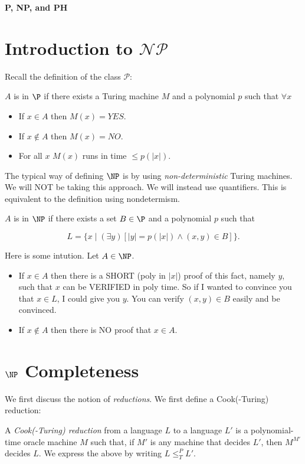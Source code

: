 \documentclass[12pt]{article}
\begin{document}
\centerline{\bf P, NP, and PH }


\section{Introduction to $\mathcal{NP}$}
Recall the definition of the class $\mathcal{P}$: 

\begin{definition}
$A$ is in $\P$ if
there exists a Turing machine $M$ and a polynomial $p$ such that $\forall x$
\begin{itemize}
\item
If $x\in A$ then $M(x)=YES$.
\item
If $x\notin A$ then $M(x)=NO$.
\item
For all $x$ $M(x)$ runs in time $\le p(|x|)$.
\end{itemize}
\end{definition}

The typical way of defining $\NP$ is by using 
\emph{non-deterministic} Turing machines. 
We will NOT be taking this approach.
We will instead use quantifiers.
This is equivalent to the definition using nondetermism.

\begin{definition}
$A$ is in $\NP$ if there exists a set $B\in \P$ and a polynomial $p$ such that 

$$L = \{ x \mid (\exists y)[ |y|=p(|x|) \wedge (x,y)\in B ] \}.$$
\end{definition}

Here is some intution. Let $A\in\NP$.
\begin{itemize}
\item
If $x\in A$ then there is a SHORT (poly in $|x|$) proof of this fact,
namely $y$, such that $x$ can be VERIFIED in poly time.
So if I wanted to convince you that $x\in L$, I could give you $y$.
You can verify $(x,y)\in B$ easily and be convinced.
\item
If $x\notin A$ then there is NO proof that $x\in A$.
\end{itemize}


\section{$\NP$ Completeness}
We first discuss the notion of \emph{reductions}.
We first define a Cook(-Turing) reduction:

\begin{definition}
A \emph{Cook(-Turing) reduction} from a language $L$ to a language $L'$ is a polynomial-time oracle machine $M$ such that,
if $M'$ is any machine that decides $L'$, then $M^{M'}$ decides $L$. We express the above by writing $L \leq_T^P L'$.
\end{definition}
\end{document}
